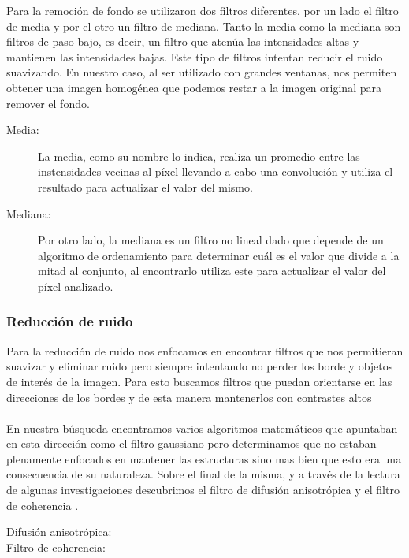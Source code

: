 Para la remoci\'on de fondo se utilizaron dos filtros diferentes, por un lado el filtro de media y por el otro un filtro de mediana. Tanto la media como la mediana son filtros de paso bajo, es decir, un filtro que aten\'ua las intensidades altas y mantienen las intensidades bajas. Este tipo de filtros intentan reducir el ruido suavizando. En nuestro caso, al ser utilizado con grandes ventanas, nos permiten obtener una imagen homogénea que podemos restar a la imagen original para remover el fondo.

\begin{description}
  \item[Media:] La media, como su nombre lo indica, realiza un promedio entre las instensidades vecinas al p\'ixel llevando a cabo una convoluci\'on y utiliza el resultado para actualizar el valor del mismo.
  \item[Mediana:] Por otro lado, la mediana es un filtro no lineal dado que depende de un algoritmo de ordenamiento para determinar cu\'al es el valor que divide a la mitad al conjunto, al encontrarlo utiliza este para actualizar el valor del p\'ixel analizado.
\end{description}

\subsubsection{Reducci\'on de ruido}

Para la reducci\'on de ruido nos enfocamos en encontrar filtros que nos permitieran suavizar y eliminar ruido pero siempre intentando no perder los borde y objetos de inter\'es de la imagen. Para esto buscamos filtros que puedan orientarse en las direcciones de los bordes y de esta manera mantenerlos con contrastes altos\\
\\En nuestra b\'usqueda encontramos varios algoritmos matem\'aticos que apuntaban en esta direcci\'on como el filtro gaussiano pero determinamos que no estaban plenamente enfocados en mantener las estructuras sino mas bien que esto era una consecuencia de su naturaleza. Sobre el final de la misma, y a trav\'es de la lectura de algunas investigaciones descubrimos el filtro de difusi\'on anisotr\'opica \cite{perona1990scale} y el filtro de coherencia \cite{weickert1999coherence}.

\begin{description}
  \item[Difusi\'on anisotr\'opica:]
  \item[Filtro de coherencia:]
\end{description}

